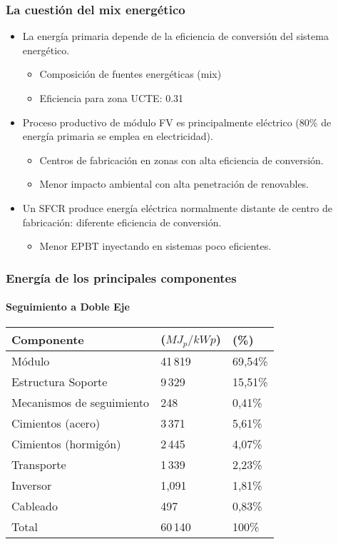 \documentclass[xcolor=dvipsnames]{beamer}
\begin{document}
\begin{frame}
  \frametitle{La cuestión del mix energético}
  \begin{itemize}
  \item La energía primaria depende de la eficiencia de conversión del
    sistema energético.
    \begin{itemize}
    \item Composición de fuentes energéticas (mix)
    \item Eficiencia para zona UCTE: 0.31
    \end{itemize}
  \item Proceso productivo de módulo FV es principalmente eléctrico
    (80\% de energía primaria se emplea en electricidad).
    \begin{itemize}
    \item Centros de fabricación en zonas con alta eficiencia de
      conversión.
    \item Menor impacto ambiental con alta penetración de renovables.
    \end{itemize}
  \item Un SFCR produce energía eléctrica normalmente distante de
    centro de fabricación: diferente eficiencia de conversión. 
    \begin{itemize}
    \item Menor EPBT inyectando en sistemas poco eficientes.
    \end{itemize}
  \end{itemize}

\end{frame}


\begin{frame}
  \frametitle{Energía de los principales componentes}
  \framesubtitle{Seguimiento a Doble Eje}
  \begin{tabular}{lll}
    \toprule
    Componente              &  ($MJ_{p}/kWp$)  &  (\%)     \\
    \midrule
    Módulo & 41\,819 & 69,54\% \\
    Estructura Soporte      &  9\,329          &  15,51\%  \\
    Mecanismos de seguimiento    &  248             &  0,41\%   \\
    Cimientos (acero)     &  3\,371          &  5,61\%   \\
    Cimientos (hormigón)  &  2\,445          &  4,07\%   \\
    Transporte              &  1\,339          &  2,23\%   \\
    Inversor               &  1,091           &  1,81\%   \\
    Cableado                 &  497             &  0,83\%   \\
    \midrule
    Total                  &  60\,140         &  100\%    \\
    \bottomrule
  \end{tabular}

\end{frame}
\end{document}
